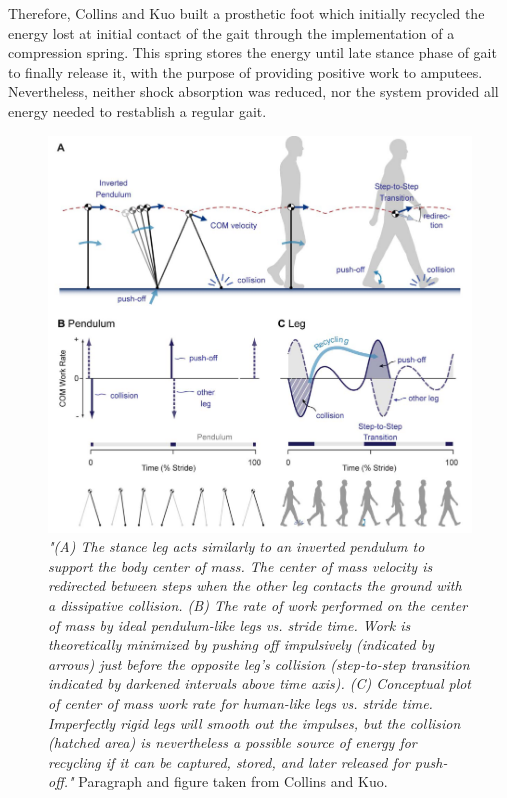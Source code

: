 \documentclass[12pt,english]{article}
\begin{document}
Therefore, Collins and Kuo \cite{Collins2010} built a prosthetic foot which initially recycled the energy lost at initial contact of the gait through the implementation of a compression spring. This spring stores the energy until late stance phase of gait to finally release it, with the purpose of providing positive work to amputees. Nevertheless, neither shock absorption was reduced, nor the system provided all energy needed to restablish a regular gait.

\begin{figure}
\begin{centering}
\includegraphics[scale=0.5]{RecycledEng}
\par\end{centering}

\caption{\label{fig:(A)-Representaci=0000F3n-de}\emph{"(A) The stance leg acts similarly to an inverted pendulum to support the body center of mass. The center of mass velocity is redirected between steps when the other leg contacts the ground with a dissipative collision. (B) The rate of work performed on the center of mass by ideal pendulum-like legs vs. stride time. Work is theoretically minimized by pushing off impulsively (indicated by arrows) just before the opposite leg’s collision (step-to-step transition indicated by darkened intervals above time axis). (C) Conceptual plot of center of mass work rate for human-like legs vs. stride time. Imperfectly rigid legs will smooth out the impulses, but the collision (hatched area) is nevertheless a possible source of energy for recycling if it can be captured, stored, and later released for push-off." }Paragraph and figure taken from Collins and Kuo\cite{Collins2010}.}


\end{figure}
\end{document}
